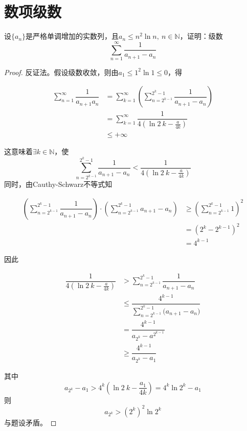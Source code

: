 \section{数项级数}

\begin{proposition}

    设$\{a_n\}$是严格单调增加的实数列，且$a_n \leq n^2 \ln n,\ n\in\mathbb{N}$，证明：级数
    $$ \sum_{n=1}^{\infty}{\dfrac{1}{a_{n+1} - a_n}}$$

\end{proposition}

\begin{proof}

    反证法。假设级数收敛，则由$a_1 \leq 1^2 \ln1 \leq 0$，得
    
    \begin{align*}
        \sum_{n=1}^{\infty}{\dfrac{1}{a_{n+1}a_n}} &= \sum_{k=1}^{\infty}{\left(\sum_{n=2^{k-1}}^{2^k - 1}{\dfrac{1}{a_{n+1}-a_n}}\right)}\\
        &= \sum_{k=1}^{\infty}{\dfrac{1}{4(\ln{2}\ k-\frac{a}{4k})}}\\
        &\leq +\infty
    \end{align*}

    这意味着$\exists k \in \mathbb{N}$，使
    $$ \sum_{n=2^{k-1}}^{2^k - 1}{\dfrac{1}{a_{n+1}-a_n}} < \dfrac{1}{4(\ln{2}\ k-\frac{a}{4k})}$$
    同时，由\textup{Cauthy-Schwarz}不等式知

    \begin{align*}
        \left( \sum_{n=2^{k-1}}^{2^k - 1}{\dfrac{1}{a_{n+1}-a_n}} \right) \cdot \left( \sum_{n=2^{k-1}}^{2^k - 1}{a_{n+1}-a_n} \right) &\geq \left( \sum_{n=2^{k-1}}^{2^k - 1}{1} \right)^2\\
        & = (2^k - 2^{k-1})^2\\
        & = 4^{k-1}
    \end{align*}

    因此

    \begin{align*}
        \dfrac{1}{4(\ln{2}\ k-\frac{a}{4k})} &> \sum_{n=2^{k-1}}^{2^k - 1}{\dfrac{1}{a_{n+1}-a_n}}\\
        & \leq \dfrac{4^{k-1}}{\sum_{n=2^{k-1}}^{2^k - 1}{(a_{n+1}-a_n})}\\
        & = \dfrac{4^{k-1}}{a_{2^k} - a^{2^{k-1}}}\\
        & \geq \dfrac{4^{k-1}}{a_{2^k} - a_1}
    \end{align*}

    其中
    $$a_{2^k} - a_1 > 4^k\left(\ln{2}\ k - \dfrac{a_1}{4k}\right) = 4^k \ln{2^k} - a_1$$
    则
    $$a_{2^k} > (2^k)^2 \ln{2^k}$$
    与题设矛盾。

\end{proof}

